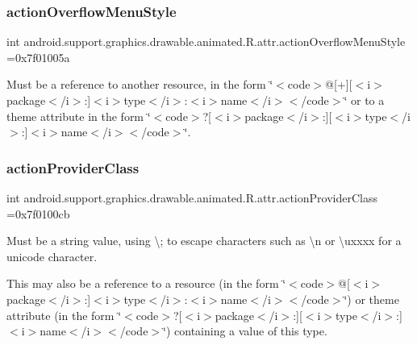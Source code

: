 \subsubsection{\texorpdfstring{action\+Overflow\+Menu\+Style}{actionOverflowMenuStyle}}
{\footnotesize\ttfamily int android.\+support.\+graphics.\+drawable.\+animated.\+R.\+attr.\+action\+Overflow\+Menu\+Style =0x7f01005a\hspace{0.3cm}{\ttfamily [static]}}

Must be a reference to another resource, in the form \char`\"{}$<$code$>$@\mbox{[}+\mbox{]}\mbox{[}$<$i$>$package$<$/i$>$\+:\mbox{]}$<$i$>$type$<$/i$>$\+:$<$i$>$name$<$/i$>$$<$/code$>$\char`\"{} or to a theme attribute in the form \char`\"{}$<$code$>$?\mbox{[}$<$i$>$package$<$/i$>$\+:\mbox{]}\mbox{[}$<$i$>$type$<$/i$>$\+:\mbox{]}$<$i$>$name$<$/i$>$$<$/code$>$\char`\"{}. \mbox{\label{classandroid_1_1support_1_1graphics_1_1drawable_1_1animated_1_1R_1_1attr_a5cf52dc49c7a13447e6ea9a12b6afc16}} 
\subsubsection{\texorpdfstring{action\+Provider\+Class}{actionProviderClass}}
{\footnotesize\ttfamily int android.\+support.\+graphics.\+drawable.\+animated.\+R.\+attr.\+action\+Provider\+Class =0x7f0100cb\hspace{0.3cm}{\ttfamily [static]}}

Must be a string value, using \textquotesingle{}\textbackslash{};\textquotesingle{} to escape characters such as \textquotesingle{}\textbackslash{}n\textquotesingle{} or \textquotesingle{}\textbackslash{}uxxxx\textquotesingle{} for a unicode character. 

This may also be a reference to a resource (in the form \char`\"{}$<$code$>$@\mbox{[}$<$i$>$package$<$/i$>$\+:\mbox{]}$<$i$>$type$<$/i$>$\+:$<$i$>$name$<$/i$>$$<$/code$>$\char`\"{}) or theme attribute (in the form \char`\"{}$<$code$>$?\mbox{[}$<$i$>$package$<$/i$>$\+:\mbox{]}\mbox{[}$<$i$>$type$<$/i$>$\+:\mbox{]}$<$i$>$name$<$/i$>$$<$/code$>$\char`\"{}) containing a value of this type. \mbox{\label{classandroid_1_1support_1_1graphics_1_1drawable_1_1animated_1_1R_1_1attr_a03ab1cd26806e67ffa654d4c61f82ba3}} 
